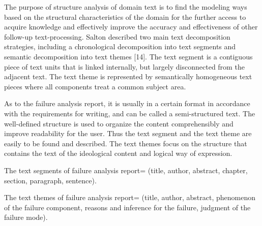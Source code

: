 \documentclass{elsarticle}
\begin{document}
The purpose of structure analysis of domain text is to find the
modeling ways based on the structural characteristics of the domain
for the further access to acquire knowledge and effectively improve
the accuracy and effectiveness of other follow-up
text-processing. Salton described two main text decomposition
strategies, including a chronological decomposition into text segments
and semantic decomposition into text themes [14]. The text segment is
a contiguous piece of text units that is linked internally, but
largely disconnected from the adjacent text. The text theme is
represented by semantically homogeneous text pieces where all
components treat a common subject area.

As to the failure analysis report, it is usually in a certain format
in accordance with the requirements for writing, and can be called a
semi-structured text. The well-defined structure is used to organize
the content comprehensibly and improve readability for the user. Thus
the text segment and the text theme are easily to be found and
described. The text themes focus on the structure that contains the
text of the ideological content and logical way of expression.

\begin{itshape}
  The text segments of failure analysis report= (title, author,
  abstract, chapter, section, paragraph, sentence). 

The text themes of failure analysis report= (title, author, abstract, phenomenon of the failure component, reasons and inference for the failure, judgment of the failure mode).

\end{itshape}
\end{document}

